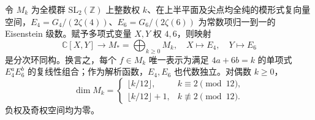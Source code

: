 \begin{theorem}[全模群的模形式环]\label{b3:thm:23-modular-ring}
令 \(M_k\) 为全模群 \(\mathrm{SL}_2(\mathbb Z)\) 上整数权 \(k\)、在上半平面及尖点均全纯的模形式复向量空间，\(E_4=G_4/(2\zeta(4))\)、\(E_6=G_6/(2\zeta(6))\) 为常数项归一到一的 Eisenstein 级数。赋予多项式变量 \(X,Y\) 权 \(4,6\)，则映射
\[
 \mathbb C[X,Y]\longrightarrow M_*=
 \bigoplus_{k\ge0}M_k,\quad X\longmapsto E_4,\quad Y\longmapsto E_6
\]
是分次环同构。换言之，每个 \(f\in M_k\) 唯一表示为满足 \(4a+6b=k\) 的单项式 \(E_4^aE_6^b\) 的复线性组合；作为解析函数，\(E_4,E_6\) 也代数独立。对偶数 \(k\ge0\)，
\[
\dim M_k=\begin{cases}\lfloor k/12\rfloor,&k\equiv2\pmod{12},\\
\lfloor k/12\rfloor+1,&k\not\equiv2\pmod{12}.
\end{cases}
\]
负权及奇权空间均为零。
\end{theorem}
